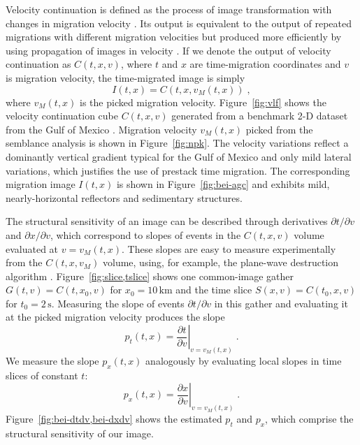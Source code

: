 Velocity continuation is defined as the process of image
transformation with changes in migration velocity
\cite[]{me,GEO68-05-16501661}. Its output is equivalent to the output of repeated migrations with different migration velocities \cite[]{GEO66-06-16991713} but
produced more efficiently by using propagation of images in
velocity \cite[]{hubral}. If we denote the output of velocity
continuation as $C(t,x,v)$, where $t$ and $x$ are time-migration
coordinates and $v$ is migration velocity, the time-migrated image is
simply
\begin{equation}
\label{eq:image}
I(t,x) = C(t,x,v_M(t,x))\;,
\end{equation}
where $v_M(t,x)$ is the picked migration
velocity. Figure~\ref{fig:vlf} shows the velocity continuation cube
$C(t,x,v)$ generated from a benchmark 2-D dataset from the Gulf of
Mexico \cite[]{bei}. Migration velocity $v_M(t,x)$ picked from the semblance
analysis is shown in Figure~\ref{fig:npk}. The velocity variations
reflect a dominantly vertical gradient typical for the Gulf of Mexico and only
mild lateral variations, which justifies the use of prestack time
migration. The corresponding migration image $I(t,x)$ is shown in
Figure~\ref{fig:bei-agc} and exhibits mild, nearly-horizontal
reflectors and sedimentary structures.




The structural sensitivity of an image can be described through
derivatives $\partial t/\partial v$ and $\partial x/\partial v$, which
correspond to slopes of events in the $C(t,x,v)$ volume evaluated at
$v=v_M(t,x)$. These slopes are easy to measure experimentally from the
$C(t,x,v_M)$ volume, using, for example, the plane-wave destruction
algorithm \cite[]{GEO67-06-19461960,fpwd,opwd}. Figure~\ref{fig:slice,tslice}
shows one common-image gather $G(t,v)=C(t,x_0,v)$ for
$x_0=10\,\mbox{km}$ and the time slice $S(x,v)=C(t_0,x,v)$ for
$t_0=2\,\mbox{s}$. Measuring the slope of events $\partial t/\partial
v$ in this gather and evaluating it at the picked migration velocity
produces the slope
\begin{equation}
\label{eq:pt}
p_t(t,x) = \left.\frac{\partial t}{\partial v}\right|_{v=v_M(t,x)}\;.
\end{equation}
We measure the slope $p_x(t,x)$ analogously by evaluating local slopes
in time slices of constant $t$:
\begin{equation}
\label{eq:px}
p_x(t,x) = \left.\frac{\partial x}{\partial v}\right|_{v=v_M(t,x)}\;.
\end{equation}
Figure~\ref{fig:bei-dtdv,bei-dxdv} shows the estimated $p_t$ and $p_x$, which comprise the structural sensitivity of our image.


